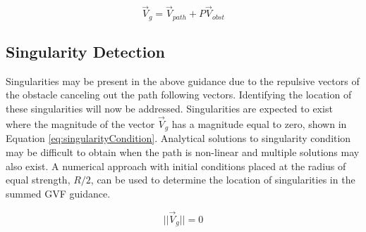 \documentclass[conf]{new-aiaa}
\begin{document}
\begin{equation}
\label{eq:totalGuidanceObstacle}
\overrightarrow{V}_g = \overrightarrow{V}_{path} + P\overrightarrow{V}_{obst}
\end{equation}




\subsection{Singularity Detection}
Singularities may be present in the above guidance due to the repulsive vectors of the obstacle canceling out the path following vectors. Identifying the location of these singularities will now be addressed. Singularities are expected to exist where the magnitude of the vector $\overrightarrow{V}_g$ has a magnitude equal to zero, shown in Equation \ref{eq:singularityCondition}. Analytical solutions to singularity condition may be difficult to obtain when the path is non-linear and multiple solutions may also exist. A numerical approach with initial conditions placed at the radius of equal strength, $R/2$, can be used to determine the location of singularities in the summed GVF guidance. 


 \begin{equation}
\label{eq:singularityCondition}
||\overrightarrow{V}_g || = 0
\end{equation}







 




\end{document}
